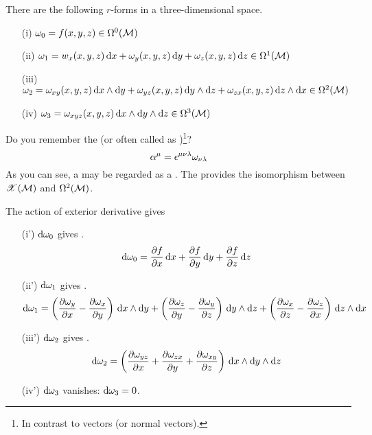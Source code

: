 \documentclass[a4paper, 10pt]{article}
\begin{document}
\begin{example}
    There are the following $r$-forms in a three-dimensional space.
    \begin{itemize}
        \item[(i)] $\omega_{0} = f(x, y, z) \in \Omega^{0}(\mathcal{M})$
        \item[(ii)] $\omega_{1} = w_{x}(x,y,z)\,\mathrm{d}{x} + \omega_{y}(x,y,z)\,\mathrm{d}{y} + \omega_{z}(x,y,z)\,\mathrm{d}{z} \in \Omega^{1}(\mathcal{M})$
        \item[(iii)] $\omega_{2} = \omega_{xy}(x,y,z)\,\mathrm{d}{x}\wedge\mathrm{d}{y} + \omega_{yz}(x,y,z)\,\mathrm{d}{y}\wedge\mathrm{d}{z} + \omega_{zx}(x,y,z)\,\mathrm{d}{z}\wedge\mathrm{d}{x} \in \Omega^{2}(\mathcal{M})$
        \item[(iv)] $\omega_{3} = \omega_{xyz}(x,y,z)\,\mathrm{d}{x}\wedge\mathrm{d}{y}\wedge\mathrm{d}{z} \in \Omega^{3}(\mathcal{M})$
    \end{itemize}
     Do you remember the  (or often called as )\footnote{In contrast to  vectors (or normal vectors).}?
    \[ \alpha^{\mu} = \epsilon^{\mu\nu\lambda}\omega_{\nu\lambda} \]
    As you can see, a  may be regarded as a . The  provides the isomorphism between $\mathscr{X}(\mathcal{M})$ and $\Omega^{2}(\mathcal{M})$.

    The action of exterior derivative gives
    \begin{itemize}
        \item[(i')] $\mathrm{d}\omega_{0}$ gives .
        \[ \mathrm{d}\omega_{0} = \frac{\partial{f}}{\partial{x}}\,\mathrm{d}{x} + \frac{\partial{f}}{\partial{y}}\,\mathrm{d}{y} + \frac{\partial{f}}{\partial{z}}\,\mathrm{d}{z} \]
        \item[(ii')] $\mathrm{d}\omega_{1}$ gives .
        \[ \mathrm{d}\omega_{1} = \left(\frac{\partial\omega_{y}}{\partial{x}} - \frac{\partial\omega_{x}}{\partial{y}}\right)\,\mathrm{d}{x}\wedge\mathrm{d}{y} + \left(\frac{\partial\omega_{z}}{\partial{y}} - \frac{\partial\omega_{y}}{\partial{z}}\right)\,\mathrm{d}{y}\wedge\mathrm{d}{z} + \left(\frac{\partial\omega_{x}}{\partial{z}} - \frac{\partial\omega_{z}}{\partial{x}}\right)\,\mathrm{d}{z}\wedge\mathrm{d}{x} \]
        \item[(iii')] $\mathrm{d}\omega_{2}$ gives .
        \[ \mathrm{d}\omega_{2} = \left(\frac{\partial\omega_{yz}}{\partial{x}} + \frac{\partial\omega_{zx}}{\partial{y}} + \frac{\partial\omega_{xy}}{\partial{z}}\right)\,\mathrm{d}{x}\wedge\mathrm{d}{y}\wedge\mathrm{d}{z} \]
        \item[(iv')] $\mathrm{d}\omega_{3}$ vanishes: $\mathrm{d}\omega_{3} = 0$.
    \end{itemize}
\end{example}
\newpage
\end{document}
